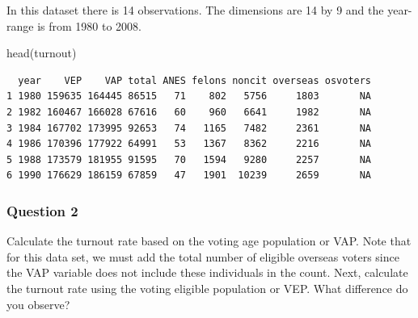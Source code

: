 \documentclass[
  letterpaper,
  DIV=11,
  numbers=noendperiod]{scrartcl}
\newenvironment{Shaded}{\begin{snugshade}}{\end{snugshade}}
\newcommand{\ControlFlowTok}[1]{\textcolor[rgb]{0.00,0.23,0.31}{\textbf{#1}}}
\newcommand{\FunctionTok}[1]{\textcolor[rgb]{0.28,0.35,0.67}{#1}}
\newcommand{\NormalTok}[1]{\textcolor[rgb]{0.00,0.23,0.31}{#1}}
\newcommand{\OtherTok}[1]{\textcolor[rgb]{0.00,0.23,0.31}{#1}}
\newcommand{\SpecialCharTok}[1]{\textcolor[rgb]{0.37,0.37,0.37}{#1}}
\newcommand{\StringTok}[1]{\textcolor[rgb]{0.13,0.47,0.30}{#1}}
\begin{document}
\begin{Shaded}
\end{Shaded}

In this dataset there is 14 observations. The dimensions are 14 by 9 and
the year-range is from 1980 to 2008.

\begin{Shaded}
\begin{Highlighting}[]
\FunctionTok{head}\NormalTok{(turnout)}
\end{Highlighting}
\end{Shaded}

\begin{verbatim}
  year    VEP    VAP total ANES felons noncit overseas osvoters
1 1980 159635 164445 86515   71    802   5756     1803       NA
2 1982 160467 166028 67616   60    960   6641     1982       NA
3 1984 167702 173995 92653   74   1165   7482     2361       NA
4 1986 170396 177922 64991   53   1367   8362     2216       NA
5 1988 173579 181955 91595   70   1594   9280     2257       NA
6 1990 176629 186159 67859   47   1901  10239     2659       NA
\end{verbatim}

\subsubsection{Question 2}\label{question-2}

Calculate the turnout rate based on the voting age population or VAP.
Note that for this data set, we must add the total number of eligible
overseas voters since the VAP variable does not include these
individuals in the count. Next, calculate the turnout rate using the
voting eligible population or VEP. What difference do you observe?
\end{document}
